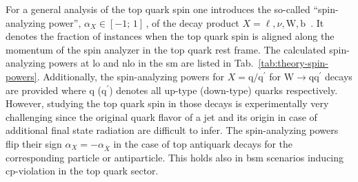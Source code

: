  

For a general analysis of the top quark spin one introduces the so-called ``spin-analyzing power'', $\alpha_{X}\in[-1;\,1]$\,, of the decay product $X=\ell,\nu,\mathrm{W},\mathrm{b}$~\cite{AguilarSaavedra:2010nx}. It denotes the fraction of instances when the top quark spin is aligned along the momentum of the spin analyzer in the top quark rest frame. The calculated spin-analyzing powers at \gls{lo} and \gls{nlo} in the \gls{sm} are listed in Tab.~\ref{tab:theory-spin-powers}. Additionally, the spin-analyzing powers for $X=\mathrm{q}/\mathrm{q}^\prime$ for $\mathrm{W}\to \mathrm{q}\mathrm{q}^\prime$ decays are provided where $\mathrm{q}$ ($\mathrm{q}^\prime$) denotes all up-type (down-type) quarks respectively. However, studying the top quark spin in those decays is experimentally very challenging since the original quark flavor of a jet and its origin in case of additional final state radiation are difficult to infer. The spin-analyzing powers flip their sign $\alpha_{X}=-\alpha_{\bar{X}}$ in the case of top antiquark decays for the corresponding particle or antiparticle. This holds also in \gls{bsm} scenarios inducing \gls{cp}-violation in the top quark sector.

